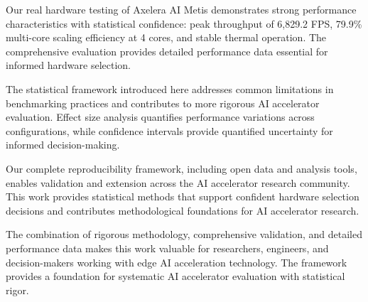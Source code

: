 \documentclass[manuscript]{acmart}
\begin{document}
Our real hardware testing of Axelera AI Metis demonstrates strong performance characteristics with statistical confidence: peak throughput of 6,829.2 FPS, 79.9\% multi-core scaling efficiency at 4 cores, and stable thermal operation. The comprehensive evaluation provides detailed performance data essential for informed hardware selection.

The statistical framework introduced here addresses common limitations in benchmarking practices and contributes to more rigorous AI accelerator evaluation. Effect size analysis quantifies performance variations across configurations, while confidence intervals provide quantified uncertainty for informed decision-making.

Our complete reproducibility framework, including open data and analysis tools, enables validation and extension across the AI accelerator research community. This work provides statistical methods that support confident hardware selection decisions and contributes methodological foundations for AI accelerator research.

The combination of rigorous methodology, comprehensive validation, and detailed performance data makes this work valuable for researchers, engineers, and decision-makers working with edge AI acceleration technology. The framework provides a foundation for systematic AI accelerator evaluation with statistical rigor.



\end{document}
